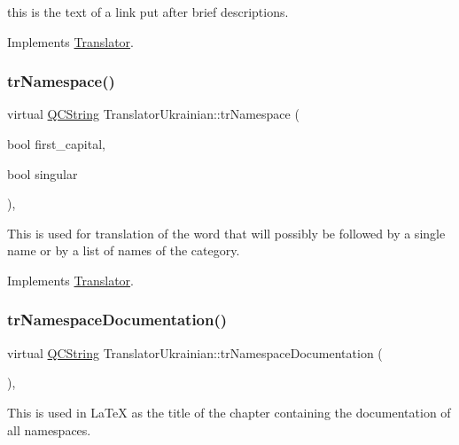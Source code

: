 this is the text of a link put after brief descriptions. 

Implements \mbox{\hyperlink{class_translator}{Translator}}.

\mbox{\label{class_translator_ukrainian_a723cfbb5aa1ec03ff8f86880b0e4a361}} 
\subsubsection{\texorpdfstring{trNamespace()}{trNamespace()}}
{\footnotesize\ttfamily virtual \mbox{\hyperlink{class_q_c_string}{Q\+C\+String}} Translator\+Ukrainian\+::tr\+Namespace (\begin{DoxyParamCaption}\item[{bool}]{first\+\_\+capital,  }\item[{bool}]{singular }\end{DoxyParamCaption})\hspace{0.3cm}{\ttfamily [inline]}, {\ttfamily [virtual]}}

This is used for translation of the word that will possibly be followed by a single name or by a list of names of the category. 

Implements \mbox{\hyperlink{class_translator}{Translator}}.

\mbox{\label{class_translator_ukrainian_a79634fd76e555f719aee90a88819861f}} 
\subsubsection{\texorpdfstring{trNamespaceDocumentation()}{trNamespaceDocumentation()}}
{\footnotesize\ttfamily virtual \mbox{\hyperlink{class_q_c_string}{Q\+C\+String}} Translator\+Ukrainian\+::tr\+Namespace\+Documentation (\begin{DoxyParamCaption}{ }\end{DoxyParamCaption})\hspace{0.3cm}{\ttfamily [inline]}, {\ttfamily [virtual]}}

This is used in La\+TeX as the title of the chapter containing the documentation of all namespaces. 

